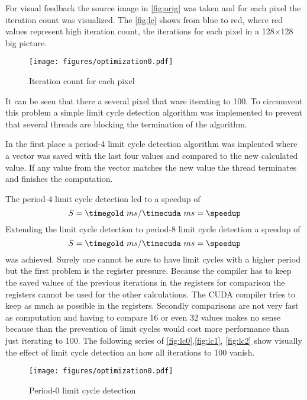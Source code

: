For visual feedback the source image in \autoref{fig:orig} was taken and for
each pixel the iteration count was visualized. The \autoref{fig:lc} shows
from blue to red, where red values represent high iteration count, the iterations
for each pixel in a 128$\times$128 big picture.

\begin{figure}[ht] \centering
\texttt{[image: figures/optimization0.pdf]}%
\caption{Iteration count for each pixel}
\label{fig:lc}%
\end{figure}

It can be seen that there a several pixel that ware iterating to 100. To circumvent
this problem a simple limit cycle detection algorithm was implemented to prevent
that several threads are blocking the termination of the algorithm. 

In the first place a period-4 limit cycle detection algorithm was implented where
a vector was saved with the last four values and compared to the new calculated 
value. If any value from the vector matches the new value the thread terminates
and finishes the computation. 

The period-4 limit cycle detection led to a speedup of 
\fpDiv{\speedup}{\timegold}{\timecuda}
\begin{equation*}\label{eq:speedup9}
	S = \timegold\ ms/\timecuda\ ms = \speedup
\end{equation*}
Extending the limit cycle detection to period-8 limit cycle detection a speedup
of 
\fpDiv{\speedup}{\timegold}{\timecuda}
\begin{equation*}\label{eq:speedup10}
	S = \timegold\ ms/\timecuda\ ms = \speedup
\end{equation*}
was achieved. Surely one cannot be sure to have limit cycles with a higher
period but the first problem is the register pressure. Because the compiler has
to keep the saved values of the previous iterations in the registers for
comparison the registers cannot be used for the other calculations. The
\gls{CUDA} compiler tries to keep as much as possible in the registers. Secondly
comparisons are not very fast as computation and having to compare 16 or even 32
values makes no sense because than the prevention of limit cycles would cost
more performance than just iterating to 100. The following series of
\autoref{fig:lc0},\autoref{fig:lc1}, \autoref{fig:lc2} show visually the effect
of limit cycle detection an how all iterations to 100 vanish.

\begin{figure}[ht] \centering
\texttt{[image: figures/optimization0.pdf]}%
\caption{Period-0 limit cycle detection}
\label{fig:lc0}%
\end{figure}

